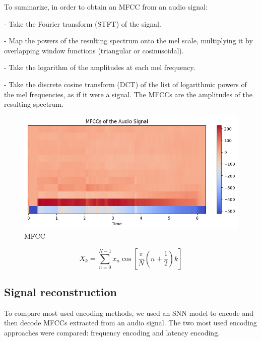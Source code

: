 \documentclass[11pt]{article}
\begin{document}
To summarize, in order to obtain an MFCC from an audio signal:

- Take the Fourier transform (STFT) of the signal.

- Map the powers of the resulting spectrum onto the mel scale, multiplying it by overlapping window functions (triangular or cosinusoidal).

- Take the logarithm of the amplitudes at each mel frequency.

- Take the discrete cosine transform (DCT) of the list of logarithmic powers of the mel frequencies, as if it were a signal. The MFCCs are the amplitudes of the resulting spectrum.


\begin{figure}[h]
  \centering
  \begin{minipage}{0.75\textwidth}
    \centering
    \includegraphics[width=1\textwidth]{"image/MFCC_piano.png"}
    \caption{MFCC}
    \label{fig:MFCC_piano}
  \end{minipage}\hfill
\end{figure}



\begin{equation}
  X_k = \sum_{n=0}^{N-1} x_n \cos \left[ \frac{\pi}{N} \left( n + \frac{1}{2} \right) k \right]
  \label{eq:dct}
\end{equation}



\subsection{Signal reconstruction}

To compare most used encoding methods, we used an SNN model to encode and then decode MFCCs extracted from an audio signal. The two most used encoding approaches were compared: frequency encoding and latency encoding.
\end{document}

